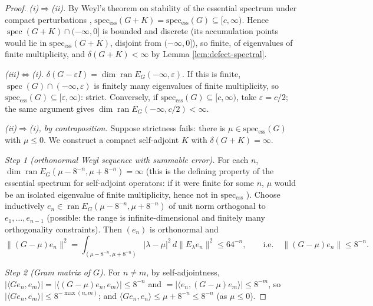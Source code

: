 \documentclass[11pt,reqno]{amsart}
\theoremstyle{definition}
\newcommand{\spec}{\operatorname{spec}}
\newcommand{\specess}{\operatorname{spec_{ess}}}
\newcommand{\ran}{\operatorname{ran}}
\begin{document}
\begin{proof}
\emph{(i)\(\Rightarrow\)(ii).} By Weyl's theorem on stability of the essential
spectrum under compact perturbations \cite[Thm.\ IV.5.35]{Kato},
\(\specess(G+K)=\specess(G)\subseteq[c,\infty)\). Hence
\(\spec(G+K)\cap(-\infty,0]\) is bounded and discrete (its accumulation points
would lie in \(\specess(G+K)\), disjoint from \((-\infty,0]\)), so finite, of
eigenvalues of finite multiplicity, and \(\delta(G+K)<\infty\) by Lemma
\ref{lem:defect-spectral}.

\emph{(iii)\(\Leftrightarrow\)(i).} \(\delta(G-\varepsilon I)=\dim\ran
E_G(-\infty,\varepsilon)\). If this is finite, \(\spec(G)\cap(-\infty,\varepsilon)\)
is finitely many eigenvalues of finite multiplicity, so
\(\specess(G)\subseteq[\varepsilon,\infty)\): strict. Conversely, if
\(\specess(G)\subseteq[c,\infty)\), take \(\varepsilon=c/2\); the same argument
gives \(\dim\ran E_G(-\infty,c/2)<\infty\).

\emph{(ii)\(\Rightarrow\)(i), by contraposition.} Suppose strictness fails:
there is \(\mu\in\specess(G)\) with \(\mu\leq0\). We construct a compact
self-adjoint \(K\) with \(\delta(G+K)=\infty\).

\emph{Step 1 (orthonormal Weyl sequence with summable error).} For each \(n\),
\(\dim\ran E_G(\mu-8^{-n},\mu+8^{-n})=\infty\) (this is the defining property of
the essential spectrum for self-adjoint operators: if it were finite for some
\(n\), \(\mu\) would be an isolated eigenvalue of finite multiplicity, hence not
in \(\specess\) \cite[\S XIII.4]{ReedSimon}). Choose inductively
\(e_n\in\ran E_G(\mu-8^{-n},\mu+8^{-n})\) of unit norm orthogonal to
\(e_1,\dots,e_{n-1}\) (possible: the range is infinite-dimensional and finitely
many orthogonality constraints). Then \((e_n)\) is orthonormal and
\[
\|(G-\mu)e_n\|^2=\int_{(\mu-8^{-n},\mu+8^{-n})}|\lambda-\mu|^2\,d\|E_\lambda e_n\|^2
\leq 64^{-n},\qquad\text{i.e.}\quad\|(G-\mu)e_n\|\leq 8^{-n}.
\]

\emph{Step 2 (Gram matrix of \(G\)).} For \(n\neq m\), by self-adjointness,
\(|\langle Ge_n,e_m\rangle|=|\langle(G-\mu)e_n,e_m\rangle|\leq 8^{-n}\) and
\(=|\langle e_n,(G-\mu)e_m\rangle|\leq 8^{-m}\), so
\(|\langle Ge_n,e_m\rangle|\leq 8^{-\max(n,m)}\); and
\(\langle Ge_n,e_n\rangle\leq\mu+8^{-n}\leq8^{-n}\) (as \(\mu\leq0\)).


\end{proof}
\end{document}
